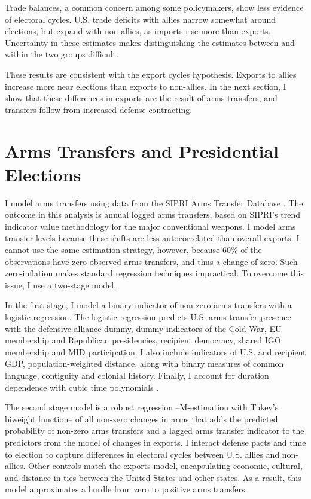 \documentclass[12pt]{article}
\begin{document}
Trade balances, a common concern among some policymakers, show less evidence of electoral cycles. 
U.S. trade deficits with allies narrow somewhat around elections, but expand with non-allies, as imports rise more than exports. 
Uncertainty in these estimates makes distinguishing the estimates between and within the two groups difficult.


These results are consistent with the export cycles hypothesis. 
Exports to allies increase more near elections than exports to non-allies.
In the next section, I show that these differences in exports are the result of arms transfers, and transfers follow from increased defense contracting.



\section{Arms Transfers and Presidential Elections}


I model arms transfers using data from the SIPRI Arms Transfer Database \citep{SIPRI2021}.
The outcome in this analysis is annual logged arms transfers, based on SIPRI's trend indicator value methodology for the major conventional weapons.
I model arms transfer levels because these shifts are less autocorrelated than overall exports.
I cannot use the same estimation strategy, however, because 60\% of the observations have zero observed arms transfers, and thus a change of zero.
Such zero-inflation makes standard regression techniques impractical.
To overcome this issue, I use a two-stage model. 


In the first stage, I model a binary indicator of non-zero arms transfers with a logistic regression. 
The logistic regression predicts U.S. arms transfer presence with the defensive alliance dummy, dummy indicators of the Cold War, EU membership and Republican presidencies, recipient democracy, shared IGO membership and MID participation. 
I also include indicators of U.S. and recipient GDP, population-weighted distance, along with binary measures of common language, contiguity and colonial history. 
Finally, I account for duration dependence with cubic time polynomials \citep{CarterSignorino2010}.


The second stage model is a robust regression --M-estimation with Tukey's biweight function-- of all non-zero changes in arms that adds the predicted probability of non-zero arms transfers and a lagged arms transfer indicator to the predictors from the model of changes in exports.
I interact defense pacts and time to election to capture differences in electoral cycles between U.S. allies and non-allies. 
Other controls match the exports model, encapsulating economic, cultural, and distance in ties between the United States and other states. 
As a result, this model approximates a hurdle from zero to positive arms transfers.
\end{document}
